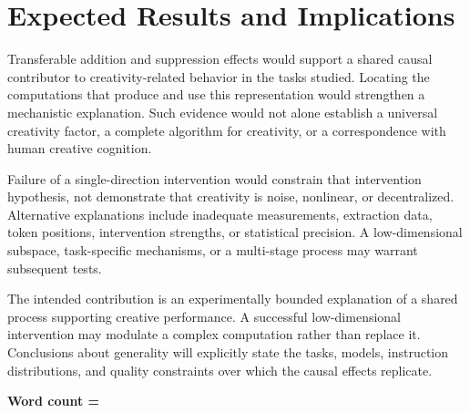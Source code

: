 \documentclass{article}
\begin{document}
\section{Expected Results and Implications}
\countem
Transferable addition and suppression effects would support a shared causal contributor to creativity-related behavior in the tasks studied. Locating the computations that produce and use this representation would strengthen a mechanistic explanation. Such evidence would not alone establish a universal creativity factor, a complete algorithm for creativity, or a correspondence with human creative cognition.

Failure of a single-direction intervention would constrain that intervention hypothesis, not demonstrate that creativity is noise, nonlinear, or decentralized. Alternative explanations include inadequate measurements, extraction data, token positions, intervention strengths, or statistical precision. A low-dimensional subspace, task-specific mechanisms, or a multi-stage process may warrant subsequent tests.

The intended contribution is an experimentally bounded explanation of a shared process supporting creative performance. A successful low-dimensional intervention may modulate a complex computation rather than replace it. Conclusions about generality will explicitly state the tasks, models, instruction distributions, and quality constraints over which the causal effects replicate.


\endcountem
\textbf{Word count = \thewordcount{}}

\printbibliography
\end{document}
